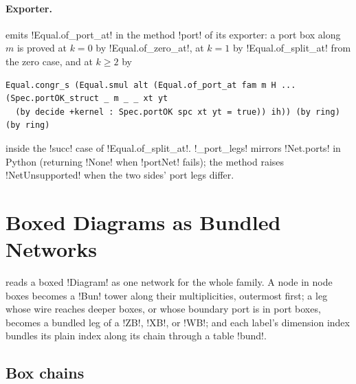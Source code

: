 {\paragraph{Exporter.}  emits \lbx!Equal.of_port_at! in the method \py!port! of its exporter: a port box along $m$ is proved at $k=0$ by \lbx!Equal.of_zero_at!, at $k=1$ by \lbx!Equal.of_split_at! from the zero case, and at $k\ge2$ by
\begin{lstlisting}[style=leanbox]
Equal.congr_s (Equal.smul alt (Equal.of_port_at fam m H ... (Spec.portOK_struct _ m _ _ xt yt
  (by decide +kernel : Spec.portOK spc xt yt = true)) ih)) (by ring) (by ring)
\end{lstlisting}
inside the \lbx!succ! case of \lbx!Equal.of_split_at!. \py!_port_legs! mirrors \lbx!Net.ports! in Python (returning \py!None! when \lbx!portNet! fails); the method raises \py!NetUnsupported! when the two sides' port legs differ.

\section{Boxed Diagrams as Bundled Networks}\label{sec:boxes-bridge}

 reads a boxed \lbx!Diagram! as one network for the whole family. A node in node boxes becomes a \lbx!Bun! tower along their multiplicities, outermost first; a leg whose wire reaches deeper boxes, or whose boundary port is in port boxes, becomes a bundled leg of a \lbx!ZB!, \lbx!XB!, or \lbx!WB!; and each label's dimension index bundles its plain index along its chain through a table \lbx!bund!.

\subsection{Box chains}

}
